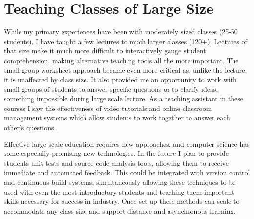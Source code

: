 \documentclass[a4paper, 11pt]{article}
\begin{document}
\section{Teaching Classes of Large Size}
While my primary experiences have been with moderately sized
classes (25-50 students), I have taught a few lectures to much
larger classes (120+). Lectures of that size make it much more
difficult to interactively gauge student comprehension, making
alternative teaching tools all the more important. The small
group worksheet approach became even more critical as, unlike
the lecture, it is unaffected by class size. It also provided
me an opportunity to work with small groups of students to
answer specific questions or to clarify ideas, something impossible
during large scale lecture. As a teaching assistant in these
courses I saw the effectiveness of video tutorials and online
classroom management systems which allow students to work together to answer each other's questions.

Effective large scale education requires new approaches,
and computer science has some especially promising new
technologies. In the future I plan to provide students
unit tests and source code analysis tools, allowing them
to receive immediate and automated feedback. This could
be integrated with version control and continuous build systems,
simultaneously allowing these techniques to be used with even
the most introductory students and teaching them important
skills necessary for success in industry. Once set up these
methods can scale to accommodate any class size and support
distance and asynchronous learning.

\begin{comment}
\section{Outreach}
During my masters I was the chair of an ACM SIG set up to organize
the MegaMinerAI programming competition each semester.
In this competition small teams of students are given
24 hours to write programs which act as the player in a computer game.
These programs compete with those written by other students,
with the results visualized. The competition focuses on making
it as easy as possible to write useful AIs, and making the game
as visually interpretable as possible. These goals help create
a community building challenge which is open to creativity and
translates student's work into visual improvement.
The competition saw a significant growth in participation under
my direction, with nearly 100 competitors from a department of
only 400 students. For my work with the organization the department
awarded me “Leader of the Year.”
\end{comment}
\end{document}

